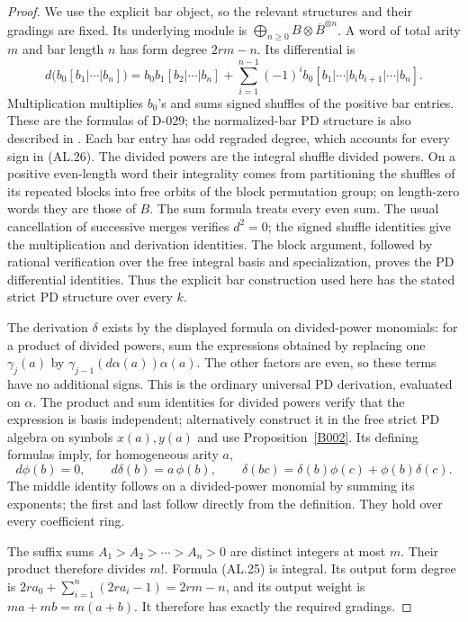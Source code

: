 \begin{proof}
We use the explicit bar object, so the relevant structures
and their gradings are fixed.  Its underlying module is
$\bigoplus_{n\geq0}B\otimes\overline B^{\otimes n}$.
A word of total arity $m$ and bar length $n$ has form
degree $2rm-n$.  Its differential is
\[
 d\bigl(b_0[b_1|\cdots|b_n]\bigr)
 =b_0b_1[b_2|\cdots|b_n]
 +\sum_{i=1}^{n-1}(-1)^i
       b_0[b_1|\cdots|b_i b_{i+1}|\cdots|b_n].
 \tag{AL.26}
\]
Multiplication multiplies $b_0$'s and sums signed shuffles
of the positive bar entries.  These are the formulas of
D-029; the normalized-bar PD structure is also described in
\cite[Theorem 7.5, pp.~250--251; \S8, pp.~252--253]{B_Richter2009}.
Each bar entry has odd regraded degree, which
accounts for every sign in \textup{(AL.26)}.
The divided powers are the integral shuffle divided
powers.  On a positive even-length word their integrality
comes from partitioning the shuffles of its repeated
blocks into free orbits of the block permutation group;
on length-zero words they are those of $B$.  The sum
formula treats every even sum.  The usual cancellation of
successive merges verifies $d^2=0$; the signed shuffle
identities give the multiplication and derivation
identities.  The block argument, followed by rational
verification over the free integral basis and
specialization, proves the PD differential identities.
Thus the explicit bar construction used here has the
stated strict PD structure over every $k$.

The derivation $\delta$ exists by the displayed formula on
divided-power monomials: for a product of divided powers,
sum the expressions obtained by replacing one
$\gamma_j(a)$ by
$\gamma_{j-1}(d\alpha(a))\alpha(a)$.
The other factors are even, so these terms have no
additional signs.  This is the ordinary universal PD
derivation, evaluated on $\alpha$.  The product and sum
identities for divided powers verify that the expression
is basis independent; alternatively construct it in the
free strict PD algebra on symbols $x(a),y(a)$ and use
Proposition~\ref{B002}.
Its defining formulas imply, for homogeneous arity $a$,
\[
 d\phi(b)=0,\qquad d\delta(b)=a\,\phi(b),\qquad
 \delta(bc)=\delta(b)\phi(c)+\phi(b)\delta(c).
 \tag{AL.27}
\]
The middle identity follows on a divided-power monomial
by summing its exponents; the first and last follow
directly from the definition.  They hold over every
coefficient ring.

The suffix sums $A_1>A_2>\cdots>A_n>0$ are distinct
integers at most $m$.  Their product therefore divides
$m!$.  Formula \textup{(AL.25)} is integral.
Its output form degree is
$2ra_0+\sum_{i=1}^n(2ra_i-1)=2rm-n$, and its output
weight is $ma+mb=m(a+b)$.  It therefore has exactly the
required gradings.


\end{proof}

